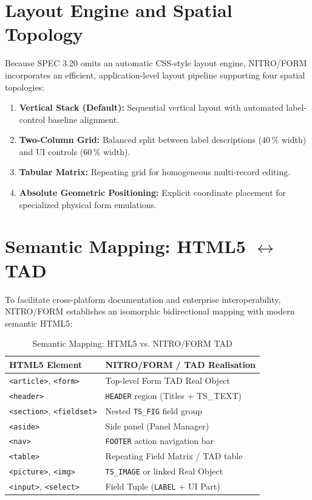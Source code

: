 \documentclass[10pt,journal,compsoc,twocolumn]{article}
\begin{document}
\section{Layout Engine and Spatial Topology}
\label{sec:layout}

Because SPEC 3.20 omits an automatic CSS-style layout engine, NITRO/FORM incorporates an efficient, application-level layout pipeline supporting four spatial topologies:

\begin{enumerate}[leftmargin=*]
    \item \textbf{Vertical Stack (Default):} Sequential vertical layout with automated label-control baseline alignment.
    \item \textbf{Two-Column Grid:} Balanced split between label descriptions ($40\,\%$ width) and UI controls ($60\,\%$ width).
    \item \textbf{Tabular Matrix:} Repeating grid for homogeneous multi-record editing.
    \item \textbf{Absolute Geometric Positioning:} Explicit coordinate placement for specialized physical form emulations.
\end{enumerate}

\section{Semantic Mapping: HTML5 \texorpdfstring{$\leftrightarrow$}{<->} TAD}
\label{sec:semantic_mapping}

To facilitate cross-platform documentation and enterprise interoperability, NITRO/FORM establishes an isomorphic bidirectional mapping with modern semantic HTML5:

\begin{table}[htbp]
\caption{Semantic Mapping: HTML5 vs. NITRO/FORM TAD}
\label{tab:html_mapping}
\centering
\scriptsize
\begin{tabular}{@{}p{3.0cm}p{4.4cm}@{}}
\toprule
\textbf{HTML5 Element} & \textbf{NITRO/FORM / TAD Realisation} \\
\midrule
\texttt{<article>}, \texttt{<form>} & Top-level Form TAD Real Object \\
\texttt{<header>}                   & \texttt{HEADER} region (Titles + TS\_TEXT) \\
\texttt{<section>}, \texttt{<fieldset>} & Nested \texttt{TS\_FIG} field group \\
\texttt{<aside>}                    & Side panel (Panel Manager) \\
\texttt{<nav>}                      & \texttt{FOOTER} action navigation bar \\
\texttt{<table>}                    & Repeating Field Matrix / TAD table \\
\texttt{<picture>}, \texttt{<img>}  & \texttt{TS\_IMAGE} or linked Real Object \\
\texttt{<input>}, \texttt{<select>} & Field Tuple (\texttt{LABEL} + UI Part) \\
\bottomrule
\end{tabular}
\end{table}
\end{document}

